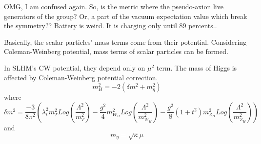 \documentclass[aps,preprint,floatfix,nofootinbib,showpacs]{revtex4-1}
\begin{document}
OMG, I am confused again. So, is the metric where the pseudo-axion live 
generators of the group? 
Or, a part of the vacuum expectation value which break the symmetry??
Battery is weird. It is charging only until 89 percents.. 


\bigskip
\bigskip

Basically, the scalar particles' mass terms come from their potential. 
Considering Coleman-Weinberg potential, mass terms of scalar particles can be formed.

In SLHM's CW potential, they depend only on $\mu^2$ term. 
The mass of Higgs is affected by Coleman-Weinberg potential correction. 
\begin{equation}
 m^2_H = -2 (\delta m^2 + m^2_\eta)
\end{equation}
where 
\begin{equation}
 \delta m ^2 = \frac{-3}{8 \pi^2}(\lambda^2_t m^2_T Log(\frac{\Lambda^2}{m^2_T}) 
 - \frac{g^2}{4} m^2_{W_H} Log(\frac{\Lambda^2}{m^2_{W_H}}) - 
 \frac{g^2}{8}(1+t^2)m^2_{Z_H} Log(\frac{\Lambda^2}{m^2_{Z_H}}))
\end{equation}
and 
\begin{equation}
 m_\eta = \sqrt{\kappa}\mu
\end{equation}
\end{document}

